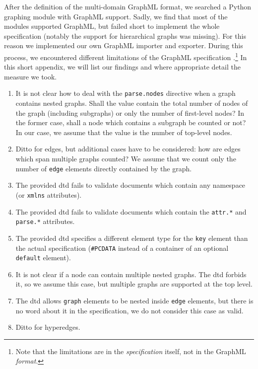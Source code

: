 
After the definition of the multi-domain GraphML format, we searched a Python graphing module with GraphML support. Sadly, we find that most of the modules supported GraphML, but failed short to implement the whole specification (notably the support for hierarchical graphs was missing). For this reason we implemented our own GraphML importer and exporter. During this process, we encountered different limitations of the GraphML specification \cite{graphml}.\footnote{Note that the limitations are in the \emph{specification} itself, not in the GraphML \emph{format}.} In this short appendix, we will list our findings and where appropriate detail the measure we took.

\begin{enumerate}
    \item It is not clear how to deal with the \texttt{parse.nodes} directive when a graph contains nested graphs. Shall the value contain the total number of nodes of the graph (including subgraphs) or only the number of first-level nodes? In the former case, shall a node which contains a subgraph be counted or not? In our case, we assume that the value is the number of top-level nodes.
    \item Ditto for edges, but additional cases have to be considered: how are edges which span multiple graphs counted? We assume that we count only the number of \texttt{edge} elements directly contained by the graph.
    \item The provided \gls{dtd} fails to validate documents which contain any namespace (or \texttt{xmlns} attributes).
    \item The provided \gls{dtd} fails to validate documents which contain the \texttt{attr.*} and \texttt{parse.*} attributes.
    \item The provided \gls{dtd} specifies a different element type for the \texttt{key} element than the actual specification (\texttt{\#PCDATA} instead of a container of an optional \texttt{default} element).
    \item It is not clear if a node can contain multiple nested graphs. The \gls{dtd} forbids it, so we assume this case, but multiple graphs are supported at the top level.
    \item The \gls{dtd} allows \texttt{graph} elements to be nested inside \texttt{edge} elements, but there is no word about it in the specification, we do not consider this case as valid.
    \item Ditto for hyperedges.

\end{enumerate}

